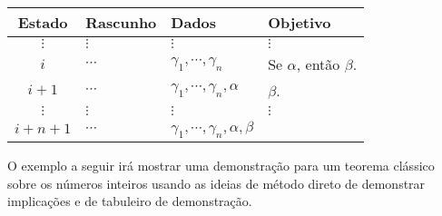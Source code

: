 \begin{table*}[h]
	\centering
	\begin{tabular}{c|l|l|l}
		\hline
		\rowcolor{cinzaClaro}
		Estado & Rascunho & Dados & Objetivo\\
		\hline
		$\vdots$ & $\vdots$ & $\vdots$ & $\vdots$\\
		$i$ & $\cdots$ &$\gamma_1, \cdots, \gamma_n$ & Se $\alpha$, então $\beta$.\\
		$i+1$ & $\cdots$ & $\gamma_1, \cdots, \gamma_n, \alpha$ & $\beta$.\\
		$\vdots$ & $\vdots$ & $\vdots$ & $\vdots$\\
		$i+n+1$ & $\cdots$ & $\gamma_1, \cdots, \gamma_n, \alpha, \beta$ & \\
		\hline
	\end{tabular}
\end{table*}

O exemplo a seguir irá mostrar uma demonstração para um teorema clássico sobre os números inteiros usando as ideias de método direto de demonstrar implicações e de tabuleiro de demonstração.


